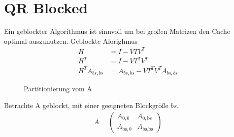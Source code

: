 %
%



\section{QR Blocked}
Ein geblockter Algorithmus ist sinnvoll um bei großen Matrizen den Cache optimal auszunutzen. 
Geblockte Alorighmus
\begin{align*}
H &= I - VTV^T\\
H^T &= I - VT^TV^T\\ 
H^TA_{bs,bs} &= A_{bs,bs} - VT^TV^TA_{bs,bs}
\end{align*}



\begin{figure}
	\centering
	
	\caption{Partitionierung vom A}
	\label{fig:blockA}
\end{figure}





Betrachte A geblockt, mit einer geeigneten Blockgröße $bs$.
\begin{align}
	A = \left(\begin{array}{l|l}
	A_{0, 0} & A_{0, \text{bs}} \\ \hline
	A_{\text{bs}, 0}   & A_{\text{bs}, \text{bs}} 	
	\end{array} \right) 
\end{align}

